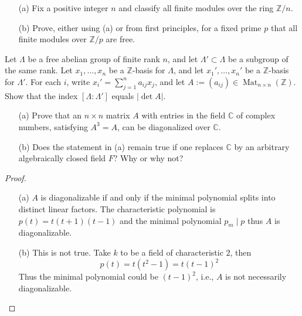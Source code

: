 \begin{prob}[F2018-Q3]
    \phantom{text}
    \begin{itemize}
        \item[(a)] Fix a positive integer \( n \) and classify all finite modules over the ring \( \mathbb{Z}/n \).
        \item[(b)] Prove, either using (a) or from first principles, for a fixed prime \( p \) that all finite modules over \( \mathbb{Z}/p \) are free.
    \end{itemize}
\end{prob}


\begin{prob}[F2017-Q2]
    Let \(\Lambda\) be a free abelian group of finite rank \(n\), and let \(\Lambda' \subset \Lambda\) be a subgroup of the same rank. Let \(x_1, \ldots, x_n\) be a \(\mathbb{Z}\)-basis for \(\Lambda\), and let \(x_1', \ldots, x_n'\) be a \(\mathbb{Z}\)-basis for \(\Lambda'\). For each \(i\), write \(x_i' = \sum_{j=1}^n a_{ij}x_j\), and let \(A := (a_{ij}) \in \operatorname{Mat}_{n \times n}(\mathbb{Z})\). Show that the index \([\Lambda : \Lambda']\) equals \(|\det A|\).
\end{prob}


\begin{prob}[S2001-Q5]
    \phantom{text}
    \begin{itemize}
        \item[(a)] Prove that an \( n \times n \) matrix \( A \) with entries in the field \( \mathbb{C} \) of complex numbers, satisfying \( A^3 = A \), can be diagonalized over \( \mathbb{C} \).
        
        \item[(b)] Does the statement in (a) remain true if one replaces \( \mathbb{C} \) by an arbitrary algebraically closed field \( F \)? Why or why not?
    \end{itemize}
\end{prob}
\begin{proof}
    \begin{itemize}
        \item[(a)] $A$ is diagonalizable if and only if the minimal polynomial splits into distinct linear factors. The characteristic polynomial is $p(t)=t(t+1)(t-1)$ and the minimal polynomial $p_m\mid p$ thus $A$ is diagonalizable.
        \item[(b)] This is not true. Take $k$ to be a field of characteristic $2$, then 
        \begin{equation*}
            p(t)=t(t^2-1)=t(t-1)^2
        \end{equation*}
        Thus the minimal polynomial could be $(t-1)^2$, i.e., $A$ is not necessarily diagonalizable.
    \end{itemize}
\end{proof}



